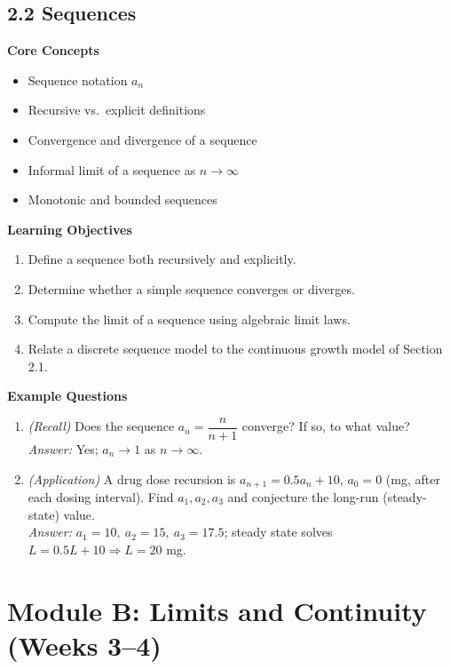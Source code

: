 \documentclass[11pt]{article}
\begin{document}
\subsection{2.2 Sequences}
\textbf{Core Concepts}
\begin{itemize}
\item Sequence notation $a_n$
\item Recursive vs.\ explicit definitions
\item Convergence and divergence of a sequence
\item Informal limit of a sequence as $n\to\infty$
\item Monotonic and bounded sequences
\end{itemize}
\textbf{Learning Objectives}
\begin{enumerate}
\item Define a sequence both recursively and explicitly.
\item Determine whether a simple sequence converges or diverges.
\item Compute the limit of a sequence using algebraic limit laws.
\item Relate a discrete sequence model to the continuous growth model of Section 2.1.
\end{enumerate}
\textbf{Example Questions}
\begin{enumerate}
\item \emph{(Recall)} Does the sequence $a_n = \dfrac{n}{n+1}$ converge? If so, to what value? \\
\textit{Answer:} Yes; $a_n \to 1$ as $n\to\infty$.
\item \emph{(Application)} A drug dose recursion is $a_{n+1} = 0.5a_n + 10$, $a_0 = 0$ (mg, after each dosing interval). Find $a_1, a_2, a_3$ and conjecture the long-run (steady-state) value. \\
\textit{Answer:} $a_1=10,\ a_2=15,\ a_3=17.5$; steady state solves $L = 0.5L+10 \Rightarrow L=20$ mg.
\end{enumerate}

\section{Module B: Limits and Continuity (Weeks 3--4)}
\end{document}
